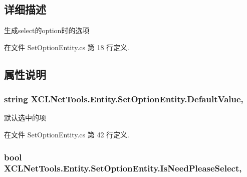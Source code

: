 \subsection{详细描述}
生成select的option时的选项 



在文件 Set\+Option\+Entity.\+cs 第 18 行定义.



\subsection{属性说明}
\subsubsection[{\texorpdfstring{Default\+Value}{DefaultValue}}]{\setlength{\rightskip}{0pt plus 5cm}string X\+C\+L\+Net\+Tools.\+Entity.\+Set\+Option\+Entity.\+Default\+Value\hspace{0.3cm}{\ttfamily [get]}, {\ttfamily [set]}}\hypertarget{class_x_c_l_net_tools_1_1_entity_1_1_set_option_entity_a504fe6ad96f52cb7eb9f8a4e64e07723}{}\label{class_x_c_l_net_tools_1_1_entity_1_1_set_option_entity_a504fe6ad96f52cb7eb9f8a4e64e07723}


默认选中的项 



在文件 Set\+Option\+Entity.\+cs 第 42 行定义.

\subsubsection[{\texorpdfstring{Is\+Need\+Please\+Select}{IsNeedPleaseSelect}}]{\setlength{\rightskip}{0pt plus 5cm}bool X\+C\+L\+Net\+Tools.\+Entity.\+Set\+Option\+Entity.\+Is\+Need\+Please\+Select\hspace{0.3cm}{\ttfamily [get]}, {\ttfamily [set]}}\hypertarget{class_x_c_l_net_tools_1_1_entity_1_1_set_option_entity_a22c7d14f09183bb9124fa9219663be6c}{}\label{class_x_c_l_net_tools_1_1_entity_1_1_set_option_entity_a22c7d14f09183bb9124fa9219663be6c}


